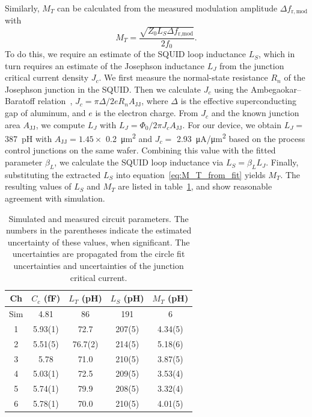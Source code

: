 \documentclass[
 prd,
 reprint,
 superscriptaddress,
 amsmath,amssymb,
 aps,
 floatfix,
]{revtex4-2}
\begin{document}
Similarly, $M_T$ can be calculated from the measured modulation amplitude $\Delta f_{\mathrm{r, mod}}$ with
\begin{equation} \label{eq:M_T_from_fit}
    M_T = \frac{\sqrt{Z_0 L_S \Delta f_{\text{r,mod}}}}{2f_0}.
\end{equation}
To do this, we require an estimate of the SQUID loop inductance $L_S$, which in turn requires an estimate of the Josephson inductance $L_J$ from the junction critical current density $J_c$. We first measure the normal-state resistance $R_n$ of the Josephson junction in the SQUID. Then we calculate $J_c$ using the Ambegaokar--Baratoff relation~\cite{ambegaokar_tunneling_1963}, $J_c = \pi \Delta/2 e R_n A_{\mathrm{JJ}}$, where $\Delta$ is the effective superconducting gap of aluminum, and $e$ is the electron charge. From $J_c$ and the known junction area $A_{\mathrm{JJ}}$, we compute $L_J$ with $L_J= \Phi_0/2\pi J_c A_\text{JJ}$. For our device, we obtain $L_J = $ \qty{387}{pH} with $A_{\mathrm{JJ}} = 1.45 \times$ \qty{0.2}{\um^2} and $J_c =$ \qty{2.93}{\uA/\um^2} based on the process control junctions on the same wafer. Combining this value with the fitted parameter $\beta_L$, we calculate the SQUID loop inductance via $L_S = \beta_L L_J$. Finally, substituting the extracted $L_S$ into equation~\eqref{eq:M_T_from_fit} yields $M_T$. The resulting values of $L_S$ and $M_T$ are listed in table~\ref{tab:circuit_params}, and show reasonable agreement with simulation.

\begin{table}[htb]
    \centering
    \begin{tabular}{c c c c c}
    \hline
         Ch & \small{$C_c$ (fF)} & \small{$L_T$ (pH)}& \small{$L_S$ (pH)} & \small{$M_T$ (pH)} \\
    \hline
    Sim & 4.81 & 86 & 191 & 6 \\
    \hline
    1 & 5.93(1) & 72.7 & 207(5) & 4.34(5) \\
    2 & 5.51(5) & 76.7(2) & 214(5) & 5.18(6) \\
    3 & 5.78 & 71.0 & 210(5) & 3.87(5) \\
    4 & 5.03(1) & 72.5 & 209(5) & 3.53(4) \\
    5 & 5.74(1) & 79.9 & 208(5) & 3.32(4) \\
    6 & 5.78(1) & 70.0 & 210(5) & 4.01(5) \\
    \hline
    \end{tabular}
    \caption{Simulated and measured circuit parameters. The numbers in the parentheses indicate the estimated uncertainty of these values, when significant. The uncertainties are propagated from the circle fit uncertainties and uncertainties of the junction critical current.}
    \label{tab:circuit_params}
\end{table}
\end{document}
